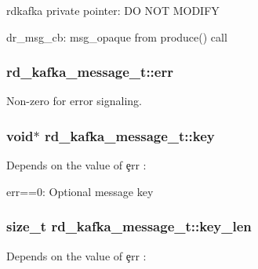 \begin{DoxyItemize}
\item rdkafka private pointer\-: D\-O N\-O\-T M\-O\-D\-I\-F\-Y
\item dr\-\_\-msg\-\_\-cb\-: msg\-\_\-opaque from produce() call 
\end{DoxyItemize}\hypertarget{structrd__kafka__message__t_aed08051a31f216cc0369c734493bbc46}{
\subsubsection[{err}]{ rd\-\_\-kafka\-\_\-message\-\_\-t\-::err}}\label{structrd__kafka__message__t_aed08051a31f216cc0369c734493bbc46}
Non-\/zero for error signaling. \hypertarget{structrd__kafka__message__t_a93cbea9d4fb7cfc3e7f546bc5d5f39e2}{
\subsubsection[{key}]{\setlength{\rightskip}{0pt plus 5cm}void$\ast$ rd\-\_\-kafka\-\_\-message\-\_\-t\-::key}}\label{structrd__kafka__message__t_a93cbea9d4fb7cfc3e7f546bc5d5f39e2}
\begin{DoxyVerb}         Depends on the value of \c err :
\end{DoxyVerb}

\begin{DoxyItemize}
\item {\ttfamily err==0}\-: Optional message key 
\end{DoxyItemize}\hypertarget{structrd__kafka__message__t_a170276e797dab0eb732db4eecd329a95}{
\subsubsection[{key\-\_\-len}]{\setlength{\rightskip}{0pt plus 5cm}size\-\_\-t rd\-\_\-kafka\-\_\-message\-\_\-t\-::key\-\_\-len}}\label{structrd__kafka__message__t_a170276e797dab0eb732db4eecd329a95}
\begin{DoxyVerb}          Depends on the value of \c err :
\end{DoxyVerb}

